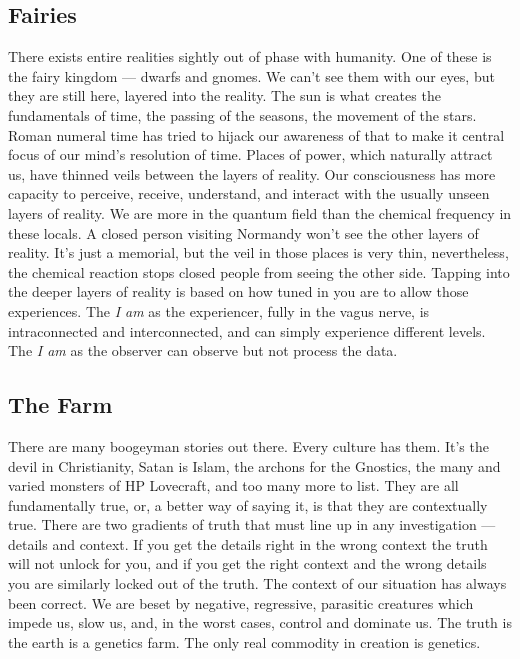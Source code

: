 \subsection{Fairies}\label{fairies}

There exists entire realities sightly out of phase with humanity. One of
these is the fairy kingdom --- dwarfs and gnomes. We can't see them with
our eyes, but they are still here, layered into the reality. The sun is
what creates the fundamentals of time, the passing of the seasons, the
movement of the stars. Roman numeral time has tried to hijack our
awareness of that to make it central focus of our mind's resolution of
time. Places of power, which naturally attract us, have thinned veils
between the layers of reality. Our consciousness has more capacity to
perceive, receive, understand, and interact with the usually unseen
layers of reality. We are more in the quantum field than the chemical
frequency in these locals. A closed person visiting Normandy won't see
the other layers of reality. It's just a memorial, but the veil in those
places is very thin, nevertheless, the chemical reaction stops closed
people from seeing the other side. Tapping into the deeper layers of
reality is based on how tuned in you are to allow those experiences. The
\emph{I am} as the experiencer, fully in the vagus nerve, is
intraconnected and interconnected, and can simply experience different
levels. The \emph{I am} as the observer can observe but not process the
data.

\subsection{The Farm}\label{the-farm}

There are many boogeyman stories out there. Every culture has them. It's
the devil in Christianity, Satan is Islam, the archons for the Gnostics,
the many and varied monsters of HP Lovecraft, and too many more to list.
They are all fundamentally true, or, a better way of saying it, is that
they are contextually true. There are two gradients of truth that must
line up in any investigation --- details and context. If you get the
details right in the wrong context the truth will not unlock for you,
and if you get the right context and the wrong details you are similarly
locked out of the truth. The context of our situation has always been
correct. We are beset by negative, regressive, parasitic creatures which
impede us, slow us, and, in the worst cases, control and dominate us.
The truth is the earth is a genetics farm. The only real commodity in
creation is genetics.

